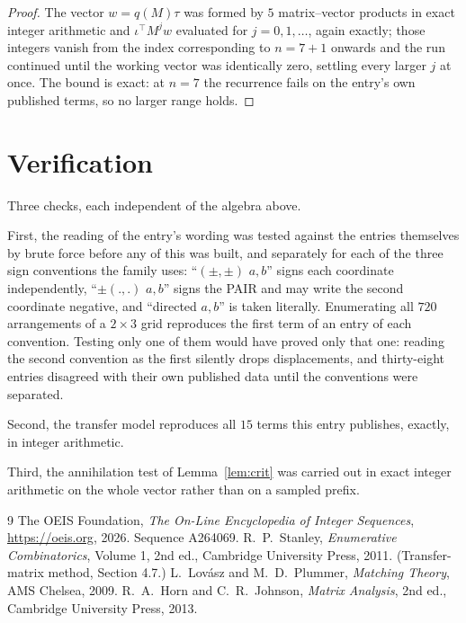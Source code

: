 \documentclass[11pt,a4paper]{article}
\theoremstyle{plain}
\theoremstyle{definition}
\begin{document}
\begin{proof}
The vector $w=q(M)\tau$ was formed by $5$ matrix--vector products in exact integer
arithmetic and $\iota^{\!\top}M^{j}w$ evaluated for $j=0,1,\dots$, again exactly; those
integers vanish from the index corresponding to $n=7+1$ onwards and the run continued
until the working vector was identically zero, settling every larger $j$ at once. The bound is exact: at $n=7$ the recurrence fails on the entry's own published terms, so no larger range holds.
\end{proof}

\section{Verification}

Three checks, each independent of the algebra above.

First, the reading of the entry's wording was tested against the entries themselves by brute
force before any of this was built, and separately for each of the three sign conventions the
family uses: ``$(\pm,\pm)$ $a,b$'' signs each coordinate independently, ``$\pm(.,.)$ $a,b$''
signs the PAIR and may write the second coordinate negative, and ``directed $a,b$'' is taken
literally. Enumerating all $720$ arrangements of a $2\times3$ grid reproduces the first term
of an entry of each convention. Testing only one of them would have proved only that one:
reading the second convention as the first silently drops displacements, and thirty-eight
entries disagreed with their own published data until the conventions were separated.

Second, the transfer model reproduces all $15$ terms this entry publishes, exactly, in
integer arithmetic.

Third, the annihilation test of Lemma~\ref{lem:crit} was carried out in exact integer
arithmetic on the whole vector rather than on a sampled prefix.

\begin{thebibliography}{9}
 The OEIS Foundation, \emph{The On-Line Encyclopedia of Integer
Sequences}, \url{https://oeis.org}, 2026. Sequence A264069.
 R.~P.~Stanley, \emph{Enumerative Combinatorics}, Volume 1, 2nd ed.,
Cambridge University Press, 2011. (Transfer-matrix method, Section 4.7.)
 L.~Lov\'asz and M.~D.~Plummer, \emph{Matching Theory}, AMS Chelsea, 2009.
 R.~A.~Horn and C.~R.~Johnson, \emph{Matrix Analysis}, 2nd ed., Cambridge
University Press, 2013.
\end{thebibliography}
\end{document}
